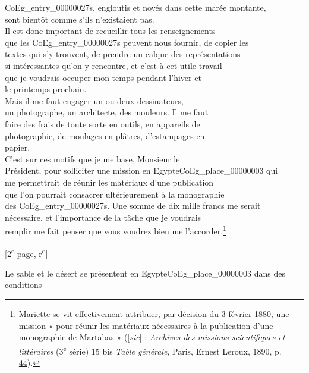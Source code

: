 \documentclass{book}
\begin{document}
{\glspl{CoEg_entry_00000027}, engloutis et noyés dans cette marée montante,\\
sont bientôt comme s’ils n’existaient pas.\\
\indent Il est donc important de recueillir tous les renseignements\\
que les \glspl{CoEg_entry_00000027} peuvent nous fournir, de copier les\\
textes qui s’y trouvent, de prendre un calque des représentations\\
si intéressantes qu’on y rencontre, et c’est à cet utile travail\\
que je voudrais occuper mon temps pendant l’hiver et\\
le printemps prochain.\\
\indent Mais il me faut engager un ou deux dessinateurs,\\
un photographe, un architecte, des mouleurs. Il me faut\\
faire des frais de toute sorte en outils, en appareils de\\
photographie, de moulages en plâtres, d’estampages en\\
papier.\\
\indent C’est sur ces motifs que je me base, Monsieur le\\
Président, pour solliciter une mission en Egypte\gls{CoEg_place_00000003} qui\\
me permettrait de réunir les matériaux d’une publication\\
que l’on pourrait consacrer ultérieurement à la monographie\\
des \glspl{CoEg_entry_00000027}. Une somme de dix mille francs me serait\\
nécessaire, et l’importance de la tâche que je voudrais\\
remplir me fait penser que vous voudrez bien me l’accorder.\footnote{Mariette se vit effectivement attribuer, par décision du 3 février 1880, une mission « pour réunir les matériaux nécessaires à la publication d'une monographie de Martabas » ([\textit{sic}] : \textit{Archives des missions scientifiques et littéraires} (3\textsuperscript{e} série) 15 bis \textit{Table générale}, Paris, Ernest Leroux, 1890, p. \href{https://gallica.bnf.fr/ark:/12148/bpt6k30470107/f66.item}{44}).}
{\footnotesize \begin{center} [2\textsuperscript{e} page, r\textsuperscript{o}]\end{center}}
Le sable et le désert se présentent en Egypte\gls{CoEg_place_00000003} dans des conditions\\
}
\end{document}
